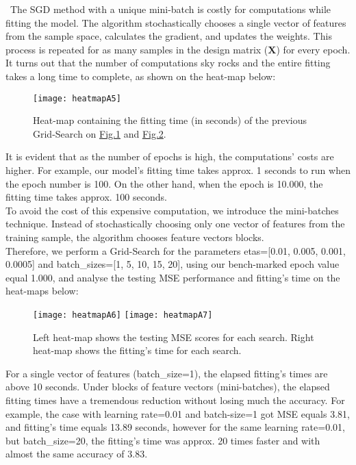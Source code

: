 \qquad \, The SGD method with a unique mini-batch is costly for computations while fitting the model. The algorithm stochastically chooses a single vector of features from the sample space, calculates the gradient, and updates the weights. This process is repeated for as many samples in the design matrix ($\boldsymbol{X}$) for every epoch. It turns out that the number of computations sky rocks and the entire fitting takes a long time to complete, as shown on the heat-map below:

\begin{figure}[H]
\label{fig:figA4}
\centering
\texttt{[image: heatmapA5]}
\caption{Heat-map containing the fitting time (in seconds) of the previous Grid-Search on \hyperref[fig:figA1]{Fig.1} and \hyperref[fig:figA2]{Fig.2}.}
\end{figure}

It is evident that as the number of epochs is high, the computations' costs are higher. For example, our model's fitting time takes approx. 1 seconds to run when the epoch number is 100. On the other hand, when the epoch is 10.000, the fitting time takes approx. 100 seconds.\\

To avoid the cost of this expensive computation, we introduce the mini-batches technique. Instead of stochastically choosing only one vector of features from the training sample, the algorithm chooses feature vectors blocks.\\

Therefore, we perform a Grid-Search for the parameters etas=[0.01, 0.005, 0.001, 0.0005] and batch\_sizes=[1, 5, 10, 15, 20], using our bench-marked epoch value equal 1.000, and analyse the testing MSE performance and fitting's time on the heat-maps below:

\begin{figure}[H]
\label{fig:figA5}
\centering
\texttt{[image: heatmapA6]}
\texttt{[image: heatmapA7]}
\caption{Left heat-map shows the testing MSE scores for each search. Right heat-map shows the fitting's time for each search.}
\end{figure}

For a single vector of features (batch\_size=1), the elapsed fitting's times are above 10 seconds. Under blocks of feature vectors (mini-batches), the elapsed fitting times have a tremendous reduction without losing much the accuracy. For example, the case with learning rate=0.01 and batch-size=1 got MSE equals 3.81, and fitting's time equals 13.89 seconds, however for the same learning rate=0.01, but batch\_size=20, the fitting's time was approx. 20 times faster and with almost the same accuracy of 3.83.

